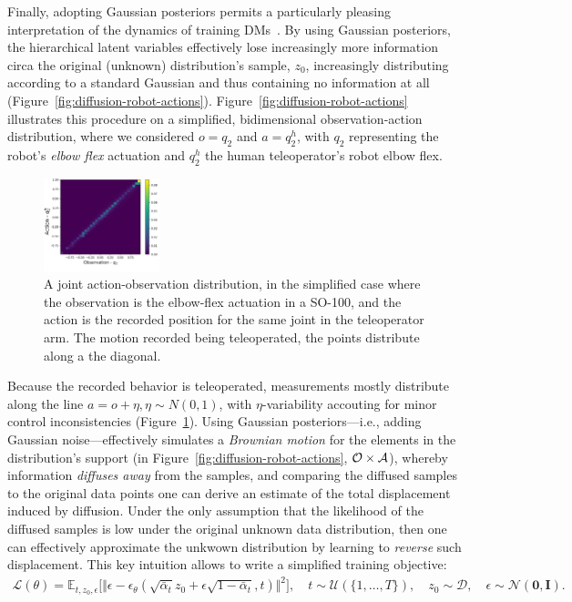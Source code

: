 Finally, adopting Gaussian posteriors permits a particularly pleasing interpretation of the dynamics of training DMs~\citep{permenterInterpretingImprovingDiffusion2024}.
By using Gaussian posteriors, the hierarchical latent variables effectively lose increasingly more information circa the original (unknown) distribution's sample, \( z_0 \), increasingly distributing according to a standard Gaussian and thus containing no information at all (Figure~\ref{fig:diffusion-robot-actions}).
Figure~\ref{fig:diffusion-robot-actions} illustrates this procedure on a simplified, bidimensional observation-action distribution, where we considered \( o=q_2\) and \( a=q^h_2\), with \( q_2 \) representing the robot's \emph{elbow flex} actuation and \( q^h_2 \) the human teleoperator's robot elbow flex.

\begin{figure}
    \centering
    \includegraphics[width=0.3\textwidth]{figures/ch4/ch4-action-vs-observation-distribution.png}
    \caption{A joint action-observation distribution, in the simplified case where the observation is the elbow-flex actuation in a SO-100, and the action is the recorded position for the same joint in the teleoperator arm. The motion recorded being teleoperated, the points distribute along a the diagonal.}
    \label{fig:ch4-action-vs-observation-distribution}
\end{figure}

Because the recorded behavior is teleoperated, measurements mostly distribute along the line \( a = o + \eta, \eta \sim N(0,1) \), with \( \eta \)-variability accouting for minor control inconsistencies (Figure~\ref{fig:ch4-action-vs-observation-distribution}).
Using Gaussian posteriors---i.e., adding Gaussian noise---effectively simulates a \emph{Brownian motion} for the elements in the distribution's support (in Figure~\ref{fig:diffusion-robot-actions}, \( \mathcal O \times \mathcal A \)), whereby information \emph{diffuses away} from the samples, and comparing the diffused samples to the original data points one can derive an estimate of the total displacement induced by diffusion.
Under the only assumption that the likelihood of the diffused samples is low under the original unknown data distribution, then one can effectively approximate the unkwown distribution by learning to \emph{reverse} such displacement.
This key intuition allows to write a simplified training objective:
\begin{align}\label{eq:diffusion-simplified-loss}
    \mathcal L(\theta) = \mathbb{E}_{t, z_0, \epsilon} \big[
        \Vert \epsilon - \epsilon_\theta(\sqrt{\bar \alpha_t} z_0 + \epsilon \sqrt{1 - \bar \alpha_t}, t) \Vert^2 \big], \quad t \sim \mathcal{U}(\{1,\dots,T\}), \quad
        z_0 \sim \mathcal{D}, \quad
        \epsilon \sim \mathcal{N}(\mathbf{0},\mathbf{I}).
\end{align}


